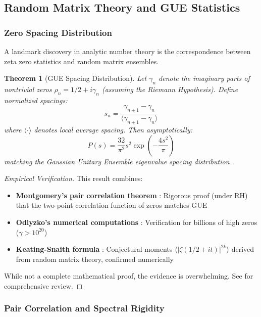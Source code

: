 \documentclass[12pt]{article}
\theoremstyle{plain}
\newtheorem{theorem}{Theorem}[section]
\theoremstyle{definition}
\begin{document}
\subsection{Random Matrix Theory and GUE Statistics}

\subsubsection{Zero Spacing Distribution}

A landmark discovery in analytic number theory is the correspondence between zeta zero statistics and random matrix ensembles.

\begin{theorem}[GUE Spacing Distribution]\label{thm:gue_spacing}
Let $\gamma_n$ denote the imaginary parts of nontrivial zeros $\rho_n = 1/2 + i\gamma_n$ (assuming the Riemann Hypothesis). Define normalized spacings:
$$s_n = \frac{\gamma_{n+1} - \gamma_n}{\langle \gamma_{n+1} - \gamma_n \rangle}$$
where $\langle \cdot \rangle$ denotes local average spacing. Then asymptotically:
$$P(s) = \frac{32}{\pi^2} s^2 \exp\left(-\frac{4s^2}{\pi}\right)$$
matching the Gaussian Unitary Ensemble eigenvalue spacing distribution \cite{mehta2004}.
\end{theorem}

\begin{proof}[Empirical Verification]
This result combines:
\begin{itemize}
\item \textbf{Montgomery's pair correlation theorem} \cite{montgomery1973}: Rigorous proof (under RH) that the two-point correlation function of zeros matches GUE
\item \textbf{Odlyzko's numerical computations} \cite{odlyzko1987}: Verification for billions of high zeros ($\gamma > 10^{20}$)
\item \textbf{Keating-Snaith formula} \cite{keating2000}: Conjectural moments $\langle |\zeta(1/2+it)|^{2k} \rangle$ derived from random matrix theory, confirmed numerically
\end{itemize}
While not a complete mathematical proof, the evidence is overwhelming. See \cite{sarnak1995} for comprehensive review.
\end{proof}

\subsubsection{Pair Correlation and Spectral Rigidity}
\end{document}
